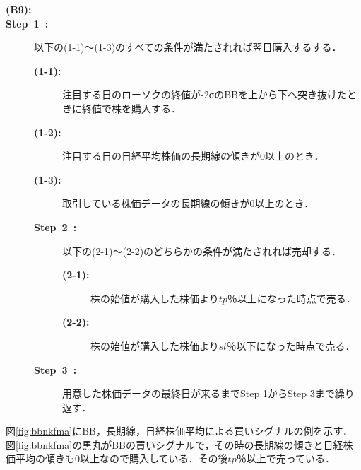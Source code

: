 \begin{description}
  \item[\textbf{(B9):}]
    \item[\textbf{Step~1~:}]以下の(1-1)～(1-3)のすべての条件が満たされれば翌日購入するする．
    \begin{description}
      \item[\textbf{(1-1):}]注目する日のローソクの終値が-2σのBBを上から下へ突き抜けたときに終値で株を購入する．
      \item[\textbf{(1-2):}]注目する日の日経平均株価の長期線の傾きが0以上のとき．
      \item[\textbf{(1-3):}]取引している株価データの長期線の傾きが0以上のとき． 
     
    \item[\textbf{Step~2~:}]以下の(2-1)～(2-2)のどちらかの条件が満たされれば売却する．
     \begin{description}
      \item[\textbf{(2-1):}]株の始値が購入した株価より$tp$％以上になった時点で売る．
      \item[\textbf{(2-2):}]株の始値が購入した株価より$sl$％以下になった時点で売る． 
     \end{description}
    \item[\textbf{Step~3~:}]用意した株価データの最終日が来るまでStep 1からStep 3まで繰り返す．
    \end{description}
  \end{description}  
 
   
  図\ref{fig:bbnkfma}にBB，長期線，日経株価平均による買いシグナルの例を示す．図\ref{fig:bbnkfma}の黒丸がBBの買いシグナルで，その時の長期線の傾きと日経株価平均の傾きも0以上なので購入している．その後$tp$％以上で売っている．

